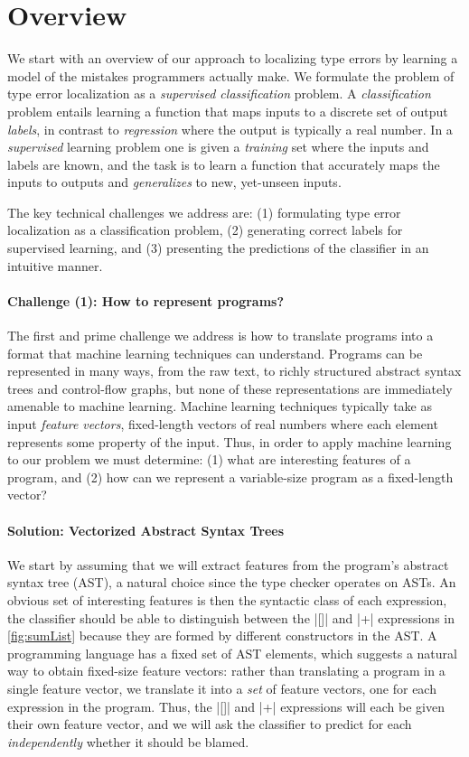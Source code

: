 \section{Overview}
\label{sec:overview}

We start with an overview of our approach to localizing type errors by
learning a model of the mistakes programmers actually make.
%
We formulate the problem of type error localization as a
\emph{supervised classification} problem.
%
A \emph{classification} problem entails learning a function that maps
inputs to a discrete set of output \emph{labels}, in contrast to
\emph{regression} where the output is typically a real number.
%
In a \emph{supervised} learning problem one is given a \emph{training}
set where the inputs and labels are known, and the task is to learn a
function that accurately maps the inputs to outputs and
\emph{generalizes} to new, yet-unseen inputs.

The key technical challenges we address are:
%
(1) formulating type error localization as a classification problem,
%
(2) generating correct labels for supervised learning, and
%
(3) presenting the predictions of the classifier in an intuitive manner.

\paragraph{\textbf{Challenge (1): How to represent programs?}}
The first and prime challenge we address is how to translate programs
into a format that machine learning techniques can understand.
%
Programs can be represented in many ways, from the raw text, to richly
structured abstract syntax trees and control-flow graphs, but none
of these representations are immediately amenable to machine learning.
%
Machine learning techniques typically take as input \emph{feature
vectors}, fixed-length vectors of real numbers where each element
represents some property of the input.
%
Thus, in order to apply machine learning to our problem we must
determine:
%
(1) what are interesting features of a program, and
%
(2) how can we represent a variable-size program as a fixed-length vector?

\paragraph{\textbf{Solution: Vectorized Abstract Syntax Trees}}
We start by assuming that we will extract features from the program's
abstract syntax tree (AST), a natural choice since the type checker
operates on ASTs.
%
An obvious set of interesting features is then the syntactic class of
each expression, \ie the classifier should be able to distinguish
between the |[]| and |+| expressions in \autoref{fig:sumList} because
they are formed by different constructors in the AST.
%
A programming language has a fixed set of AST elements, which suggests a
natural way to obtain fixed-size feature vectors: rather than translating
a program in a single feature vector, we translate it into a \emph{set} of
feature vectors, one for each expression in the program.
%
Thus, the |[]| and |+| expressions will each be given their own feature
vector, and we will ask the classifier to predict for each
\emph{independently} whether it should be blamed.

